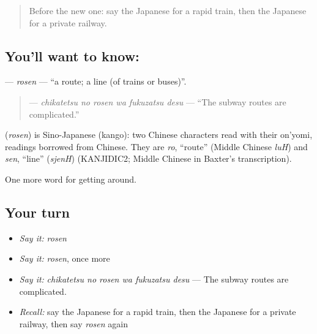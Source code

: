 \label{lesson:JA-C376-rosen}



\begin{quote}
Before the new one: say the Japanese for a rapid train, then the Japanese for a private railway.
\end{quote}

\subsection*{You'll want to know: }
\textbf{} — \emph{rosen} — \textquotedblleft{}a route; a line (of trains or buses)\textquotedblright{}.

\begin{quote}
\textbf{  } — \emph{chikatetsu no rosen wa fukuzatsu desu} — \textquotedblleft{}The subway routes are complicated.\textquotedblright{}
\end{quote}

\begin{cousinweb}
\textbf{} (\emph{rosen}) is Sino-Japanese (kango): two Chinese characters read with their on'yomi, readings borrowed from Chinese. They are \emph{ro}, \textquotedblleft{}route\textquotedblright{} (Middle Chinese \emph{luH}) and \emph{sen}, \textquotedblleft{}line\textquotedblright{} (\emph{sjenH}) (KANJIDIC2; Middle Chinese in Baxter's transcription).
\end{cousinweb}

\begin{grammarlens}[title={What you've built}]
One more word for getting around.
\end{grammarlens}

\subsection*{Your turn}
\begin{itemize}
\raggedright
  \item \emph{Say it:} \emph{rosen}
  \item \emph{Say it:} \emph{rosen}, once more
  \item \emph{Say it:} \emph{chikatetsu no rosen wa fukuzatsu desu} — The subway routes are complicated.
  \item \emph{Recall:} say the Japanese for a rapid train, then the Japanese for a private railway, then say \emph{rosen} again
\end{itemize}

